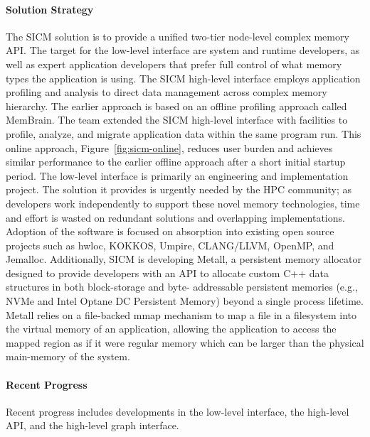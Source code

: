 \paragraph{Solution Strategy} %
The SICM solution is to provide a unified two-tier node-level complex memory API. The target for the low-level interface are system and runtime developers, as well as expert application developers that prefer full control of what memory types the application is using. 
The SICM high-level interface employs application profiling and analysis to direct data management across complex memory hierarchy. The earlier approach is based on an offline profiling approach called MemBrain. The team extended the SICM high-level interface with facilities to profile, analyze, and migrate application data within the same program run. This online approach, Figure~\ref{fig:sicm-online}, reduces user burden and achieves similar performance to the earlier offline approach after a short initial startup period.
The low-level interface is primarily an engineering and implementation project. The solution it provides is urgently needed by the HPC community; as developers work independently to support these novel memory technologies, time and effort is wasted on redundant solutions and overlapping implementations. Adoption of the software is focused on absorption into existing open source projects such as hwloc, KOKKOS, Umpire, CLANG/LLVM, OpenMP, and Jemalloc.
Additionally, SICM is developing Metall, a persistent memory allocator designed to provide developers with an API to allocate custom C++ data structures in both block-storage and byte- addressable persistent memories (e.g., NVMe and Intel Optane DC Persistent Memory) beyond a single process lifetime. Metall relies on a file-backed mmap mechanism to map a file in a filesystem into the virtual memory of an application, allowing the application to access the mapped region as if it were regular memory which can be larger than the physical main-memory of the system.

\paragraph{Recent Progress} %
Recent progress includes developments in the low-level interface, the high-level API, and the high-level graph interface.

